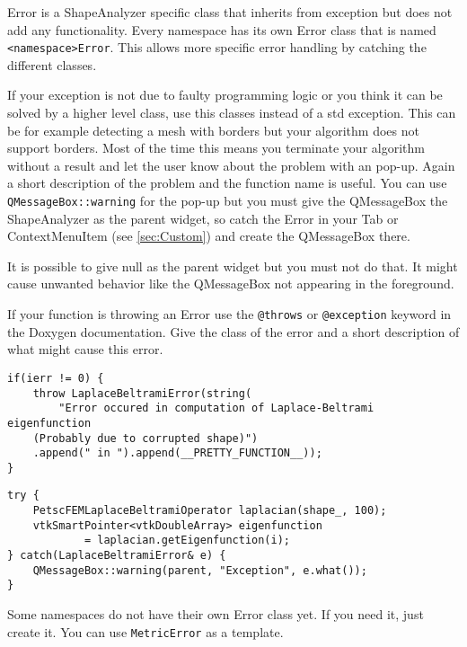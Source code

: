 Error is a ShapeAnalyzer specific class that inherits from exception but does not add any functionality. Every namespace has its own Error class that is named \texttt{<namespace>Error}. This allows more specific error handling by catching the different classes. 

If your exception is not due to faulty programming logic or you think it can be solved by a higher level class, use this classes instead of a std exception. This can be for example detecting a mesh with borders but your algorithm does not support borders. Most of the time this means you terminate your algorithm without a result and let the user know about the problem with an pop-up. Again a short description of the problem and the function name is useful. You can use \texttt{QMessageBox::warning} for the pop-up but you must give the QMessageBox the ShapeAnalyzer as the parent widget, so catch the Error in your Tab or ContextMenuItem (see \ref{sec:Custom}) and create the QMessageBox there.  
\begin{mdframed}
It is possible to give null as the parent widget but you must not do that. It might cause unwanted behavior like the QMessageBox not appearing in the foreground.
\end{mdframed}

If your function is throwing an Error use the \texttt{@throws} or \texttt{@exception} keyword in the Doxygen documentation. Give the class of the error and a short description of what might cause this error. 

\begin{lstlisting}[style=lstStyleCpp]
if(ierr != 0) {
    throw LaplaceBeltramiError(string(
        "Error occured in computation of Laplace-Beltrami eigenfunction 
	(Probably due to corrupted shape)")
	.append(" in ").append(__PRETTY_FUNCTION__));
}
\end{lstlisting}

\begin{lstlisting}[style=lstStyleCpp]
try {
    PetscFEMLaplaceBeltramiOperator laplacian(shape_, 100);
    vtkSmartPointer<vtkDoubleArray> eigenfunction 
    		= laplacian.getEigenfunction(i);
} catch(LaplaceBeltramiError& e) {
    QMessageBox::warning(parent, "Exception", e.what());
}
\end{lstlisting}

\begin{mdframed}
Some namespaces do not have their own Error class yet. If you need it, just create it. You can use \texttt{MetricError} as a template. 
\end{mdframed}

